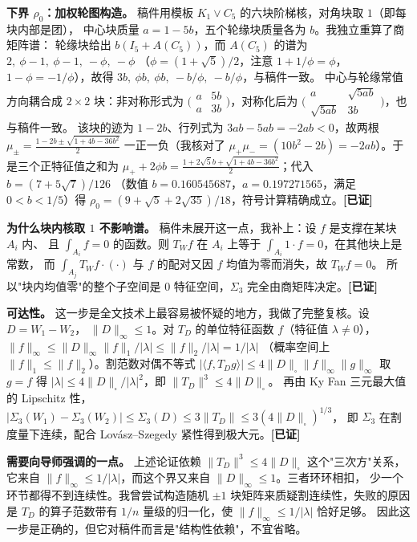 \documentclass[UTF8,11pt]{ctexart}
\theoremstyle{definition}
\newcommand{\ok}{\textcolor[rgb]{0.05,0.45,0.15}{\bfseries [已证]}}
\begin{document}
\textbf{下界 $\rho_0$：加权轮图构造。} 稿件用模板 $K_1\vee C_5$ 的六块阶梯核，对角块取 $1$（即每块内部是团），
中心块质量 $a=1-5b$，五个轮缘块质量各为 $b$。我独立重算了商矩阵谱：
轮缘块给出 $b(I_5+A(C_5))$，而 $A(C_5)$ 的谱为 $2,\ \phi-1,\ \phi-1,\ -\phi,\ -\phi$
（$\phi=(1+\sqrt5)/2$，注意 $1+1/\phi=\phi$，$1-\phi=-1/\phi$），故得
$3b,\ \phi b,\ \phi b,\ -b/\phi,\ -b/\phi$，与稿件一致。
中心与轮缘常值方向耦合成 $2\times2$ 块：非对称形式为
$\bigl(\begin{smallmatrix}a&5b\\ a&3b\end{smallmatrix}\bigr)$，对称化后为
$\bigl(\begin{smallmatrix}a&\sqrt{5ab}\\ \sqrt{5ab}&3b\end{smallmatrix}\bigr)$，也与稿件一致。
该块的迹为 $1-2b$、行列式为 $3ab-5ab=-2ab<0$，故两根
$\mu_\pm=\frac{1-2b\pm\sqrt{1+4b-36b^2}}2$ 一正一负（我核对了
$\mu_+\mu_-=(10b^2-2b)=-2ab$）。于是三个正特征值之和为
$\mu_++2\phi b=\frac{1+2\sqrt5b+\sqrt{1+4b-36b^2}}2$；代入 $b=(7+5\sqrt7)/126$
（数值 $b=0.160545687$，$a=0.197271565$，满足 $0<b<1/5$）得
$\rho_0=(9+\sqrt5+2\sqrt{35})/18$，符号计算精确成立。\hfill\ok

\textbf{为什么块内核取 $1$ 不影响谱。} 稿件未展开这一点，我补上：设 $f$ 是支撑在某块 $A_i$ 内、
且 $\int_{A_i}f=0$ 的函数。则 $T_Wf$ 在 $A_i$ 上等于 $\int_{A_i}1\cdot f=0$，在其他块上是常数，
而 $\int_{A_j}T_Wf\cdot(\cdot)$ 与 $f$ 的配对又因 $f$ 均值为零而消失，故 $T_Wf=0$。
所以"块内均值零"的整个子空间是 $0$ 特征空间，$\Sigma_3$ 完全由商矩阵决定。\hfill\ok

\textbf{可达性。} 这一步是全文技术上最容易被怀疑的地方，我做了完整复核。设 $D=W_1-W_2$，
$\|D\|_\infty\le1$。对 $T_D$ 的单位特征函数 $f$（特征值 $\lambda\ne0$），
$\|f\|_\infty\le\|D\|_\infty\|f\|_1/|\lambda|\le\|f\|_2/|\lambda|=1/|\lambda|$
（概率空间上 $\|f\|_1\le\|f\|_2$）。割范数对偶不等式
$|\langle f,T_Dg\rangle|\le4\|D\|_\square\|f\|_\infty\|g\|_\infty$ 取 $g=f$ 得
$|\lambda|\le4\|D\|_\square/|\lambda|^2$，即 $\|T_D\|^3\le4\|D\|_\square$。
再由 Ky Fan 三元最大值的 Lipschitz 性，
$|\Sigma_3(W_1)-\Sigma_3(W_2)|\le\Sigma_3(D)\le3\|T_D\|\le3(4\|D\|_\square)^{1/3}$，
即 $\Sigma_3$ 在割度量下连续，配合 Lovász--Szegedy 紧性得到极大元。\hfill\ok

\textbf{需要向导师强调的一点。} 上述论证依赖 $\|T_D\|^3\le4\|D\|_\square$ 这个"三次方"关系，
它来自 $\|f\|_\infty\le1/|\lambda|$，而这个界又来自 $\|D\|_\infty\le1$。三者环环相扣，
少一个环节都得不到连续性。我曾尝试构造随机 $\pm1$ 块矩阵来质疑割连续性，失败的原因是
$T_D$ 的算子范数带有 $1/n$ 量级的归一化，使 $\|f\|_\infty\le1/|\lambda|$ 恰好足够。
因此这一步是正确的，但它对稿件而言是"结构性依赖"，不宜省略。
\end{document}
